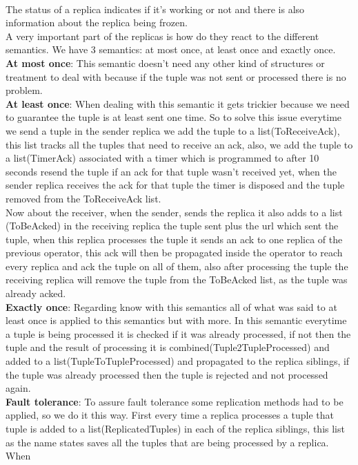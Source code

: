\documentclass[times, 10pt, twocolumn]{article}
\begin{document}
\\The status of a replica indicates if it's working or not and there is also information about the replica being frozen.
\\A very important part of the replicas is how do they react to the different semantics. We have 3 semantics: at most once, at least once and exactly once.
\\\textbf{At most once}: This semantic doesn't need any other kind of structures or treatment to deal with because if the tuple was not sent or processed there is no problem.
\\\textbf{At least once}: When dealing with this semantic it gets trickier because we need to guarantee the tuple is at least sent one time. So to solve this issue everytime we send a tuple in the sender replica we add the tuple to a list(ToReceiveAck), this list tracks all the tuples that need to receive an ack, also, we add the tuple to a list(TimerAck) associated with a timer which is programmed to after 10 seconds resend the tuple if an ack for that tuple wasn't received yet, when the sender replica receives the ack for that tuple the timer is disposed and the tuple removed from the ToReceiveAck list.
\\Now about the receiver, when the sender, sends the replica it also adds to a list (ToBeAcked) in the receiving replica the tuple sent plus the url which sent the tuple, when this replica processes the tuple it sends an ack to one replica of the previous operator, this ack will then be propagated inside the operator to reach every replica and ack the tuple on all of them, also after processing the tuple the receiving replica will remove the tuple from the ToBeAcked list, as the tuple was already acked.
\\\textbf{Exactly once}: Regarding know with this semantics all of what was said to at least once is applied to this semantics but with more. In this semantic everytime a tuple is being processed it is checked if it was already processed, if not then the tuple and the result of processing it is combined(Tuple2TupleProcessed) and added to a list(TupleToTupleProcessed) and propagated to the replica siblings, if the tuple was already processed then the tuple is rejected and not processed again.
\\\textbf{Fault tolerance}: To assure fault tolerance some replication methods had to be applied, so we do it this way. First every time a replica processes a tuple that tuple is added to a list(ReplicatedTuples) in each of the replica siblings, this list as the name states saves all the tuples that are being processed by a replica. When 
\end{document}
